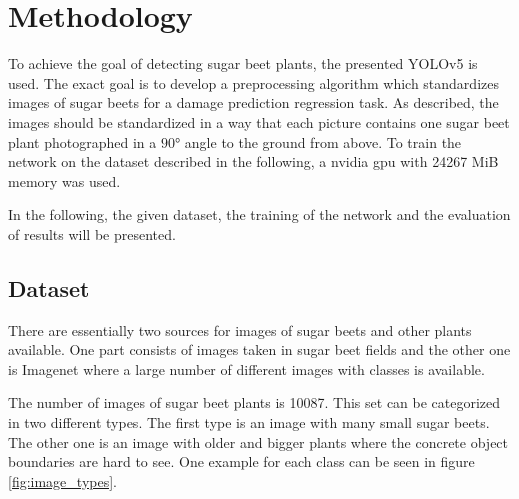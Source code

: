 
\chapter{Methodology}

To achieve the goal of detecting sugar beet plants, the presented YOLOv5 is used. The exact goal is to develop a preprocessing algorithm which standardizes images of sugar beets for a damage prediction regression task. As described, the images should be standardized in a way that each picture contains one sugar beet plant photographed in a $ 90° $ angle to the ground from above. To train the network on the dataset described in the following, a nvidia gpu with 24267 MiB memory was used.

In the following, the given dataset, the training of the network and the evaluation of results will be presented.

\section{Dataset}

There are essentially two sources for images of sugar beets and other plants available. One part consists of images taken in sugar beet fields and the other one is Imagenet \cite{deng2009imagenet} where a large number of different images with classes is available.

The number of images of sugar beet plants is 10087. This set can be categorized in two different types. The first type is an image with many small sugar beets. The other one is an image with older and bigger plants where the concrete object boundaries are hard to see. One example for each class can be seen in figure \ref{fig:image_types}.

